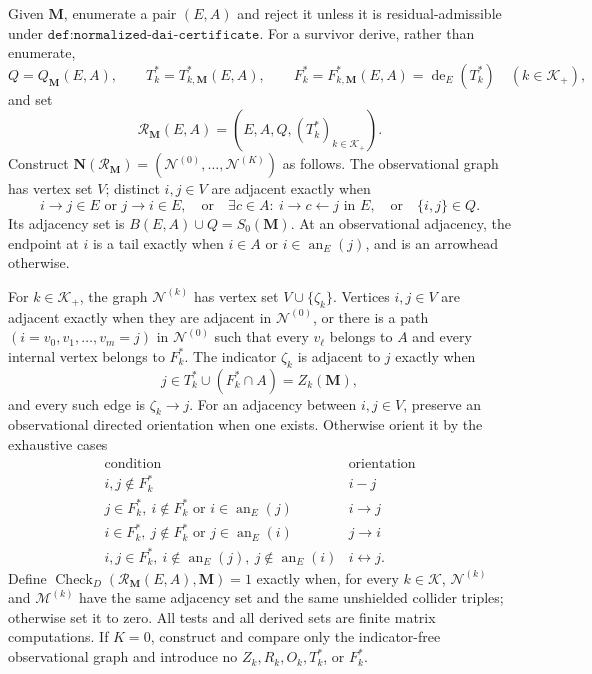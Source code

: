 Given \(\mathbf M\), enumerate a pair \((E,A)\) and reject it unless it is residual-admissible under \(\texttt{def:normalized-dai-certificate}\).  For a survivor derive, rather than enumerate,
\[
Q=Q_{\mathbf M}(E,A),
\qquad
T_k^*=T^*_{k,\mathbf M}(E,A),
\qquad
F_k^*=F^*_{k,\mathbf M}(E,A)=\operatorname{de}_E(T_k^*)
\quad(k\in\mathcal K_+),
\]
and set
\[
\mathcal R_{\mathbf M}(E,A)=
\left(E,A,Q,(T_k^*)_{k\in\mathcal K_+}\right).
\]
Construct \(\mathbf N(\mathcal R_{\mathbf M})=(\mathcal N^{(0)},\ldots,\mathcal N^{(K)})\) as follows.  The observational graph has vertex set \(V\); distinct \(i,j\in V\) are adjacent exactly when
\[
i\to j\in E\text{ or }j\to i\in E,
\quad\text{or}\quad
\exists c\in A:\ i\to c\leftarrow j\text{ in }E,
\quad\text{or}\quad
\{i,j\}\in Q.
\]
Its adjacency set is \(B(E,A)\cup Q=S_0(\mathbf M)\).  At an observational adjacency, the endpoint at \(i\) is a tail exactly when \(i\in A\) or \(i\in\operatorname{an}_E(j)\), and is an arrowhead otherwise.

For \(k\in\mathcal K_+\), the graph \(\mathcal N^{(k)}\) has vertex set \(V\cup\{\zeta_k\}\).  Vertices \(i,j\in V\) are adjacent exactly when they are adjacent in \(\mathcal N^{(0)}\), or there is a path \((i=v_0,v_1,\ldots,v_m=j)\) in \(\mathcal N^{(0)}\) such that every \(v_\ell\) belongs to \(A\) and every internal vertex belongs to \(F_k^*\).  The indicator \(\zeta_k\) is adjacent to \(j\) exactly when
\[
j\in T_k^*\cup(F_k^*\cap A)=Z_k(\mathbf M),
\]
and every such edge is \(\zeta_k\to j\).  For an adjacency between \(i,j\in V\), preserve an observational directed orientation when one exists.  Otherwise orient it by the exhaustive cases
\[
\begin{array}{c|c}
\text{condition}&\text{orientation}\\ \hline
i,j\notin F_k^*&i\mathbin{-}j\\
j\in F_k^*,\ i\notin F_k^*\text{ or }i\in\operatorname{an}_E(j)&i\to j\\
i\in F_k^*,\ j\notin F_k^*\text{ or }j\in\operatorname{an}_E(i)&j\to i\\
i,j\in F_k^*,\ i\notin\operatorname{an}_E(j),\ j\notin\operatorname{an}_E(i)&i\leftrightarrow j.
\end{array}
\]
Define \(\operatorname{Check}_{D}(\mathcal R_{\mathbf M}(E,A),\mathbf M)=1\) exactly when, for every \(k\in\mathcal K\), \(\mathcal N^{(k)}\) and \(\mathcal M^{(k)}\) have the same adjacency set and the same unshielded collider triples; otherwise set it to zero.  All tests and all derived sets are finite matrix computations.  If \(K=0\), construct and compare only the indicator-free observational graph and introduce no \(Z_k,R_k,O_k,T_k^*\), or \(F_k^*\).